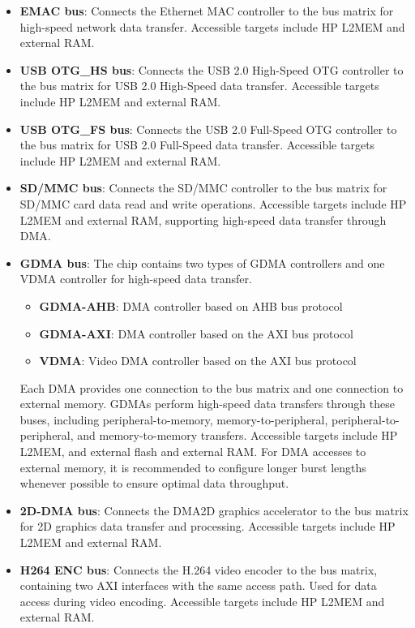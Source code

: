 \documentclass[main\_\_EN.tex]{subfiles}
\begin{document}
\begin{itemize}
    \item \textbf{EMAC bus}: Connects the Ethernet MAC controller to the bus matrix for high-speed network data transfer. Accessible targets include HP L2MEM and external RAM.

    \item \textbf{USB OTG\_HS bus}: Connects the USB 2.0 High-Speed OTG controller to the bus matrix for USB 2.0 High-Speed data transfer. Accessible targets include HP L2MEM and external RAM.

    \item \textbf{USB OTG\_FS bus}: Connects the USB 2.0 Full-Speed OTG controller to the bus matrix for USB 2.0 Full-Speed data transfer. Accessible targets include HP L2MEM and external RAM.

    \item \textbf{SD/MMC bus}: Connects the SD/MMC controller to the bus matrix for SD/MMC card data read and write operations. Accessible targets include HP L2MEM and external RAM, supporting high-speed data transfer through DMA.

    \item \textbf{GDMA bus}: The chip contains two types of GDMA controllers and one VDMA controller for high-speed data transfer.

        \begin{itemize}

            \item \textbf{GDMA-AHB}: DMA controller based on AHB bus protocol

            \item \textbf{GDMA-AXI}: DMA controller based on the AXI bus protocol

            \item \textbf{VDMA}: Video DMA controller based on the AXI bus protocol

        \end{itemize}

        Each DMA provides one connection to the bus matrix and one connection to external memory. GDMAs perform high-speed data transfers through these buses, including peripheral-to-memory, memory-to-peripheral, peripheral-to-peripheral, and memory-to-memory transfers. Accessible targets include HP L2MEM, and external flash and external RAM. For DMA accesses to external memory, it is recommended to configure longer burst lengths whenever possible to ensure optimal data throughput.

    \item \textbf{2D-DMA bus}: Connects the DMA2D graphics accelerator to the bus matrix for 2D graphics data transfer and processing. Accessible targets include HP L2MEM and external RAM.

    \item \textbf{H264 ENC bus}: Connects the H.264 video encoder to the bus matrix, containing two AXI interfaces with the same access path. Used for data access during video encoding. Accessible targets include HP L2MEM and external RAM.

\end{itemize}
\end{document}
